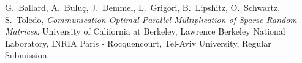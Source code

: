 \documentclass{article}
\begin{document}
\begin{thebibliography}{99}

G.~Ballard, A.~Buluç, J.~Demmel, L.~Grigori, B.~Lipshitz, O.~Schwartz, S.~Toledo,
\textit{Communication Optimal Parallel Multiplication of Sparse Random Matrices}.
University of California at Berkeley, Lawrence Berkeley National Laboratory, INRIA Paris - Rocquencourt, Tel-Aviv University,
Regular Submission.

\end{thebibliography}
\end{document}
